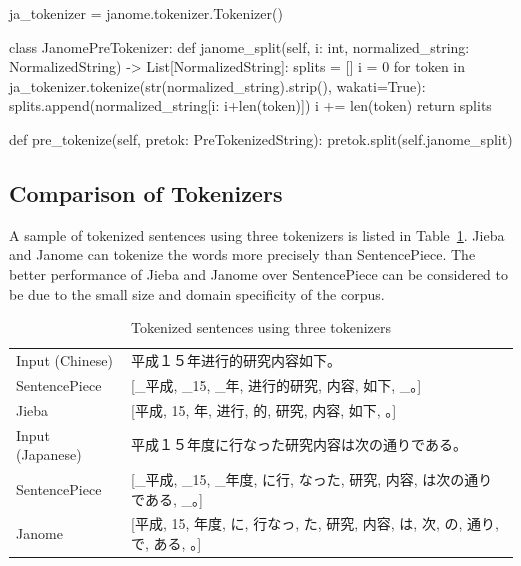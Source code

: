 \vspace{0.3cm}

\begin{python}
ja_tokenizer = janome.tokenizer.Tokenizer()

class JanomePreTokenizer:
    def janome_split(self, i: int, normalized_string: NormalizedString) -> List[NormalizedString]:
        splits = []
        i = 0
        for token in ja_tokenizer.tokenize(str(normalized_string).strip(), wakati=True):
            splits.append(normalized_string[i: i+len(token)])
            i += len(token)
        return splits
    
    def pre_tokenize(self, pretok: PreTokenizedString):
        pretok.split(self.janome_split)

\end{python}

\subsection{Comparison of Tokenizers} \label{sec:compare_tokenizers}

A sample of tokenized sentences using three tokenizers is listed in Table~\ref{tab:tokenized_sentences}. Jieba and Janome can tokenize the words more precisely than SentencePiece. The better performance of Jieba and Janome over SentencePiece can be considered to be due to the small size and domain specificity of the corpus.

\vspace{0.4cm}
\begin{CJK}{UTF8}{gbsn}
    \begin{table}[h]
        \centering
        \begin{tabularx}{\textwidth}{lb}\toprule
            Input (Chinese) & 平成１５年进行的研究内容如下。\\
            SentencePiece & [\_平成, \_15, \_年, 进行的研究, 内容, 如下, \_。] \\
            Jieba & [平成, 15, 年, 进行, 的, 研究, 内容, 如下, 。] \\\midrule
            Input (Japanese) & 平成１５年度に行なった研究内容は次の通りである。 \\
            SentencePiece & [\_平成, \_15, \_年度, に行, なった, 研究, 内容, は次の通りである, \_。] \\
            Janome & [平成, 15, 年度, に, 行なっ, た, 研究, 内容, は, 次, の, 通り, で, ある, 。] \\
            \bottomrule
        \end{tabularx}
        \caption{Tokenized sentences using three tokenizers}
        \label{tab:tokenized_sentences}
    \end{table}
\end{CJK}

